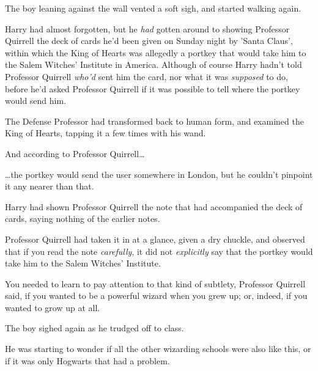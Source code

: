 The boy leaning against the wall vented a soft sigh, and started walking again.

Harry had almost forgotten, but he \emph{had} gotten around to showing 
Professor Quirrell the deck of cards he'd been given on Sunday night by 'Santa 
Claus', within which the King of Hearts was allegedly a portkey that would take 
him to the Salem Witches' Institute in America. Although of course Harry hadn't 
told Professor Quirrell \emph{who'd} sent him the card, nor what it was 
\emph{supposed} to do, before he'd asked Professor Quirrell if it was possible 
to tell where the portkey would send him.

The Defense Professor had transformed back to human form, and examined the King 
of Hearts, tapping it a few times with his wand.

And according to Professor Quirrell{\ldots}

{\ldots}the portkey would send the user somewhere in London, but he couldn't 
pinpoint it any nearer than that.

Harry had shown Professor Quirrell the note that had accompanied the deck of 
cards, saying nothing of the earlier notes.

Professor Quirrell had taken it in at a glance, given a dry chuckle, and 
observed that if you read the note \emph{carefully}, it did not 
\emph{explicitly} say that the portkey would take him to the Salem Witches' 
Institute.

You needed to learn to pay attention to that kind of subtlety, Professor 
Quirrell said, if you wanted to be a powerful wizard when you grew up; or, 
indeed, if you wanted to grow up at all.

The boy sighed again as he trudged off to class.

He was starting to wonder if all the other wizarding schools were also like 
this, or if it was only Hogwarts that had a problem.